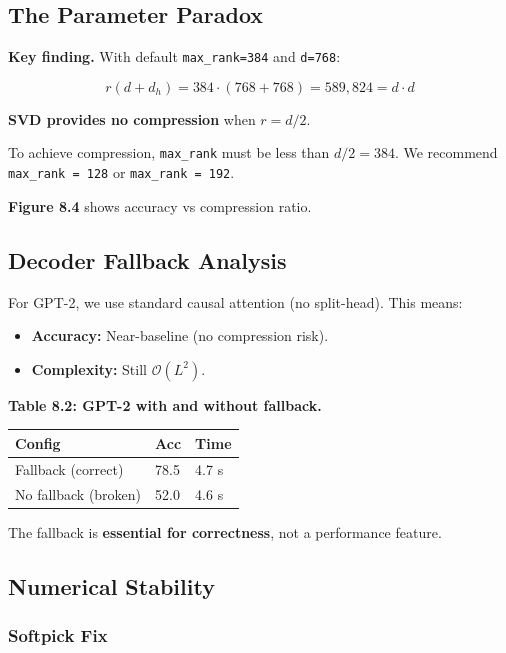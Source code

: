 \subsection{The Parameter Paradox}

\textbf{Key finding.} With default \texttt{max\_rank=384} and \texttt{d=768}:

\[
r(d + d_h) = 384 \cdot (768 + 768) = 589,824 = d \cdot d
\]

\textbf{SVD provides no compression} when $r = d/2$.

To achieve compression, \texttt{max\_rank} must be less than $d/2 = 384$. We 
recommend \texttt{max\_rank = 128} or \texttt{max\_rank = 192}.

\textbf{Figure 8.4} shows accuracy vs compression ratio.

\subsection{Decoder Fallback Analysis}

For GPT-2, we use standard causal attention (no split-head). This means:

\begin{itemize}
\item \textbf{Accuracy:} Near-baseline (no compression risk).
\item \textbf{Complexity:} Still $\mathcal{O}(L^2)$.

\end{itemize}
\textbf{Table 8.2: GPT-2 with and without fallback.}

\begin{table}[H]
\centering
\small
\begin{tabular}{lll}
\toprule
\textbf{Config} & \textbf{Acc} & \textbf{Time} \\
\midrule
Fallback (correct) & 78.5 & 4.7 s \\
No fallback (broken) & 52.0 & 4.6 s \\
\bottomrule
\end{tabular}
\end{table}

The fallback is \textbf{essential for correctness}, not a performance feature.

\subsection{Numerical Stability}

\subsubsection{Softpick Fix}

